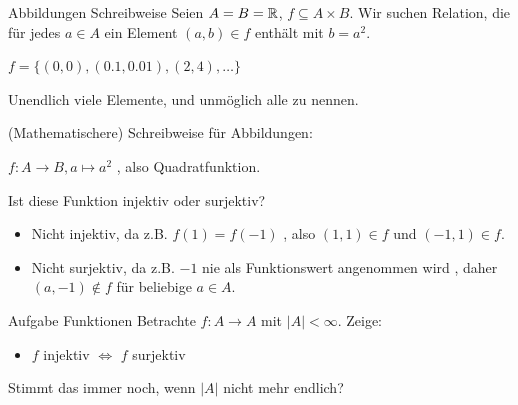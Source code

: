 \documentclass{beamer}
\begin{document}
\begin{frame}{Abbildungen Schreibweise}
	Seien $A = B = \mathbb{R}$, $f \subseteq A \times B$.   Wir suchen Relation, die für jedes $a \in A$ ein Element $(a, b) \in f$ enthält mit $b = a^2$. 
	
	$f = \{(0, 0), (0.1, 0.01), (2, 4), \dots\}$ 
	
	  Unendlich viele Elemente, und unmöglich alle zu nennen.
	
	 (Mathematischere) Schreibweise für Abbildungen: 
	
	$f : A \rightarrow B, a \mapsto a^2$  , also Quadratfunktion.
	
	  Ist diese Funktion injektiv oder surjektiv? \pause  
	
	\begin{itemize}
		\item Nicht injektiv, da z.B. $f(1) = f(-1)$  , also $(1, 1) \in f$ und $(-1, 1) \in f$. 
		\item Nicht surjektiv, da z.B. $-1$ nie als Funktionswert angenommen wird  , daher $(a, -1) \not\in f$ für beliebige $a \in A$.
	
	\end{itemize}
	
\end{frame}

\begin{frame}{Aufgabe Funktionen}
	Betrachte $f:A \rightarrow A$ mit $|A| < \infty$. Zeige:
	\begin{itemize}
		\item $f$ injektiv $\iff$ $f$ surjektiv
	\end{itemize}
	Stimmt das immer noch, wenn $|A|$ nicht mehr endlich?
\end{frame}


\end{document}
